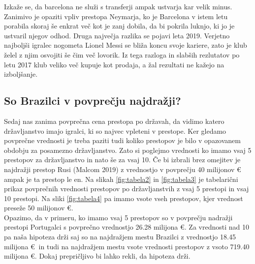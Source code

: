 \documentclass[a4paper, 12pt]{article}
\begin{document}
Izkaže se, da barcelona ne služi s transferji ampak ustvarja kar velik minus.
Zanimivo je opaziti vpliv prestopa Neymarja, ko je Barcelona v istem letu porabila skoraj še enkrat več kot je zanj dobila, da bi pokrila luknjo, ki jo je ustvaril njegov odhod.
Druga največja razlika se pojavi leta 2019. Verjetno najboljši igralec nogometa Lionel Messi se bliža koncu svoje kariere, zato je klub želel z njim osvojiti še čim več lovorik. 
Iz tega razloga in slabših rezlutatov po letu 2017 klub veliko več kupuje kot prodaja, a žal rezultati ne kažejo na izboljšanje.

\subsection{So Brazilci v povprečju najdražji?}
Sedaj nas zanima povprečna cena prestopa po državah, da vidimo katero državljanstvo imajo igralci, ki so najvec vpleteni v prestope. 
Ker gledamo povprečne vrednosti je treba paziti tudi koliko prestopov je bilo v opazovanem obdobju za posamezno državljanstvo. Zato si poglejmo vrednosti ko imamo vsaj 5 prestopov za državljanstvo in nato še za vsaj 10. Če bi izbrali brez omejitev je najdražji prestop Rusi (Malcom 2019) z vrednostjo  v povprečju 40 milijonov \euro $\,$ ampak je ta prestop le en. Na slikah \ref{fig:tabela2} in \ref{fig:tabela3} je tabelarični prikaz povprečnih vrednosti prestopov po državljanstvih z vsaj 5 prestopi in vsaj 10 prestopi. Na sliki \ref{fig:tabela4} pa imamo vsote vseh prestopov, kjer vrednost preseže 50 milijonov \euro. 
\\
Opazimo, da v primeru, ko imamo vsaj 5 prestopov so v povprečju nadražji prestopi Portugalci s povprečno vrednostjo 26.28 milijona \euro. Za vrednosti nad 10 pa naša hipoteza drži saj so na najdražjem mestu Brazilci z vrednostjo 18.45 milijona \euro $\:$ in tudi na najdražjem mestu vsote vrednosti prestopov z vsoto 719.40 milijona \euro. Dokaj prepričljivo bi lahko rekli, da hipoteza drži.
\end{document}
